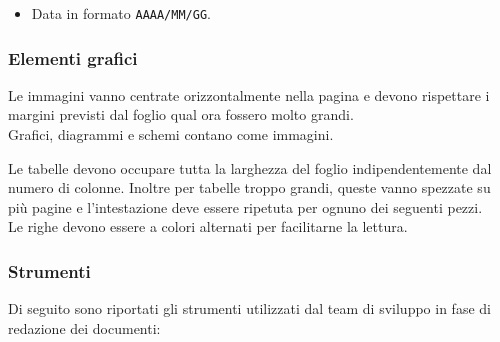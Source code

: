 
\begin{itemize}
\item Data in formato \texttt{AAAA/MM/GG}. %
\end{itemize}

\subsubsection{Elementi grafici}

    Le immagini vanno centrate orizzontalmente nella pagina e devono rispettare i margini previsti dal foglio qual ora
    fossero molto grandi.\\
    Grafici, diagrammi e schemi contano come immagini.

    Le tabelle devono occupare tutta la larghezza del foglio indipendentemente dal numero di colonne.
    Inoltre per tabelle troppo grandi, queste vanno spezzate su più pagine e l'intestazione deve essere ripetuta
    per ognuno dei seguenti pezzi.\\
    Le righe devono essere a colori alternati per facilitarne la lettura.
\pagebreak
\subsubsection{Strumenti}

Di seguito sono riportati gli strumenti utilizzati dal team di sviluppo in fase di redazione dei documenti:

